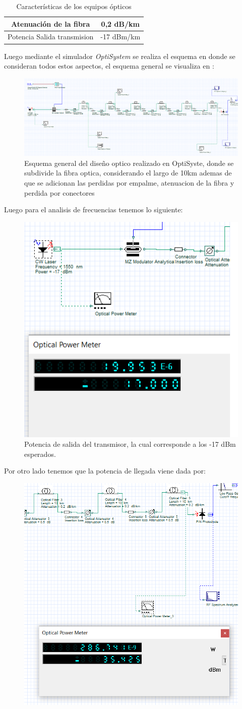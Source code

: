 \begin{enumerate}
\begin{itemize}
\begin{table}[ht]
\begin{tabular}{|c|c|}
		Atenuación de la fibra              & 0,2 dB/km      \\ \hline
		Potencia Salida transmision             & -17 dBm/km      \\ \hline
		\end{tabular}
		\caption{Características de los equipos ópticos}
		\label{tab:caracteristicas_opticas}
		\end{table}
		Luego mediante el simulador \textit{OptiSystem} se realiza el esquema en donde se consideran todos estos aspectos, el esquema general se visualiza en :
		\begin{figure}
			\centering
			\includegraphics[width=0.9\linewidth]{img/P7_1.png}
			\caption{Esquema general del diseño optico realizado en OptiSyste, donde se subdivide la fibra optica, considerando el largo de 10km ademas de que se adicionan las perdidas por empalme, atenuacion de la fibra y perdida por conectores}
			\label{fig:imagen1}
		\end{figure}
		Luego para el analisis de frecuencias tenemos lo siguiente:
		\begin{figure}
			\centering
			\includegraphics[width=0.4\linewidth]{img/P7_2.png}
			\caption{Potencia de salida del transmisor, la cual corresponde a los -17 dBm esperados.}
			\label{fig:imagen1}
		\end{figure}
		Por otro lado tenemos que la potencia de llegada viene dada por:
		\begin{figure}
			\centering
			\includegraphics[width=0.4\linewidth]{img/P7_3.png}

\end{figure}
\end{itemize}
\end{enumerate}
